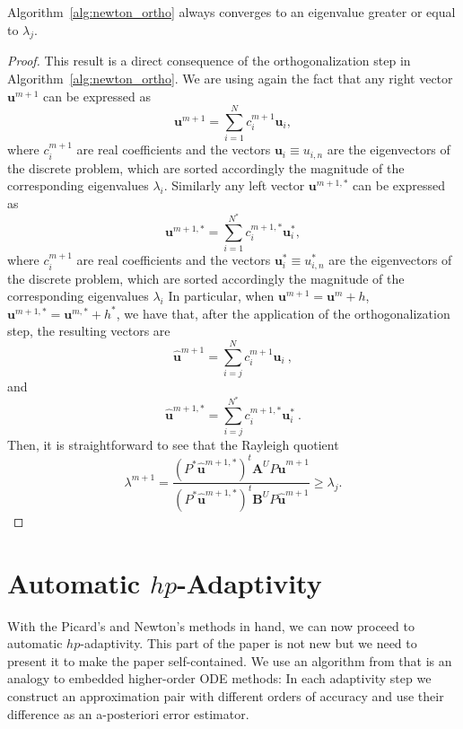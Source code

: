 \documentclass[smallextended]{svjour3}
\begin{document}
\begin{theorem}
Algorithm~\ref{alg:newton_ortho} always converges to an eigenvalue greater or equal to $\lambda_j$.
\end{theorem}

\begin{proof}
This result is a direct consequence of the orthogonalization step in Algorithm~\ref{alg:newton_ortho}.
We are using again the fact that any right vector $\mathbf{u}^{m+1}$ can be expressed as 
$$
\mathbf{u}^{m+1}=\sum_{i=1}^N c_i^{m+1} \mathbf{u}_i,
$$
where $c_i^{m+1}$ are real coefficients  and the vectors $\mathbf{u}_i\equiv u_{i,n}$ are the eigenvectors of the discrete problem, which are sorted accordingly the magnitude of the corresponding eigenvalues $\lambda_i$.
Similarly any left vector $\mathbf{u}^{m+1,*}$ can be expressed as 
$$
\mathbf{u}^{m+1,*}=\sum_{i=1}^{N^*} c_i^{m+1,*} \mathbf{u}_i^*,
$$
where $c_i^{m+1}$ are real coefficients and the vectors $\mathbf{u}_i^*\equiv u_{i,n}^*$ are the eigenvectors of the discrete problem, which are sorted accordingly the magnitude of the corresponding eigenvalues $\lambda_i$
In particular, when $\mathbf{u}^{m+1}=\mathbf{u}^m+h$, $\mathbf{u}^{m+1,*}=\mathbf{u}^{m,*}+h^*$, we have that, after the application of the orthogonalization step, the resulting vectors are
$$
\mathbf{\hat u}^{m+1}=\sum_{i=j}^N c_i^{m+1} \mathbf{u}_i\ ,
$$
and 
$$
\mathbf{\hat u}^{m+1,*}=\sum_{i=j}^{N^*} c_i^{m+1,*} \mathbf{u}_i^* \ .
$$
Then, it is straightforward to see that the Rayleigh quotient
$$
\displaystyle\lambda^{m+1}=\frac{(P^*\mathbf{\hat u}^{m+1,*})^t\mathbf{A}^U P\mathbf{\hat u}^{m+1}}{(P^*\mathbf{\hat u}^{m+1,*})^t\mathbf{B}^U P\mathbf{\hat u}^{m+1}} \ge \lambda_j.
$$
\end{proof}



\section{Automatic $hp$-Adaptivity}\label{sec:adapt}


With the Picard's and Newton's methods in hand, we can now proceed to automatic $hp$-adaptivity.
This part of the paper is not new but we need to present it to make the paper self-contained.
We use an algorithm from \cite{solin3} that is an analogy to embedded higher-order ODE methods: 
In each adaptivity step we 
construct an approximation pair with different orders of accuracy and use their difference 
as an a-posteriori error estimator. 
\end{document}
